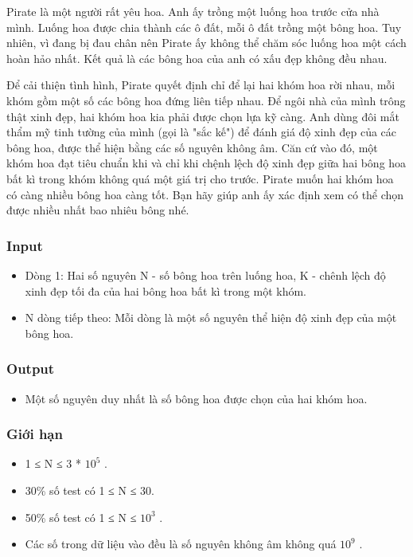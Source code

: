 



   Pirate là một người rất yêu hoa. Anh ấy trồng một luống hoa trước cửa nhà mình. Luống hoa được chia thành các ô đất, mỗi ô đất trồng một bông hoa. Tuy nhiên, vì đang bị đau chân nên Pirate ấy không thể chăm sóc luống hoa một cách hoàn hảo nhất. Kết quả là các bông hoa của anh có xấu đẹp không đều nhau.  

   Để cải thiện tình hình, Pirate quyết định chỉ để lại hai khóm hoa rời nhau, mỗi khóm gồm một số các bông hoa đứng liên tiếp nhau. Để ngôi nhà của mình trông thật xinh đẹp, hai khóm hoa kia phải được chọn lựa kỹ càng. Anh dùng đôi mắt thẩm mỹ tinh tường của mình (gọi là "sắc kế") để đánh giá độ xinh đẹp của các bông hoa, được thể hiện bằng các số nguyên không âm. Căn cứ vào đó, một khóm hoa đạt tiêu chuẩn khi và chỉ khi chệnh lệch độ xinh đẹp giữa hai bông hoa bất kì trong khóm không quá một giá trị cho trước. Pirate muốn hai khóm hoa có càng nhiều bông hoa càng tốt. Bạn hãy giúp anh ấy xác định xem có thể chọn được nhiều nhất bao nhiêu bông nhé.  

\subsubsection{   Input  }
\begin{itemize}
	\item     Dòng 1: Hai số nguyên N - số bông hoa trên luống hoa, K - chênh lệch độ xinh đẹp tối đa của hai bông hoa bất kì trong một khóm.   
	\item     N dòng tiếp theo: Mỗi dòng là một số nguyên thể hiện độ xinh đẹp của một bông hoa.   
\end{itemize}

\subsubsection{   Output  }
\begin{itemize}
	\item     Một số nguyên duy nhất là số bông hoa được chọn của hai khóm hoa.   
\end{itemize}

\subsubsection{   Giới hạn  }
\begin{itemize}
	\item     1 ≤ N ≤ 3 * $10^{5}$    .   
	\item     30\% số test có 1 ≤ N ≤ 30.   
	\item     50\% số test có 1 ≤ N ≤ $10^{3}$    .   
	\item     Các số trong dữ liệu vào đều là số nguyên không âm không quá $10^{9}$    .   
\end{itemize}


